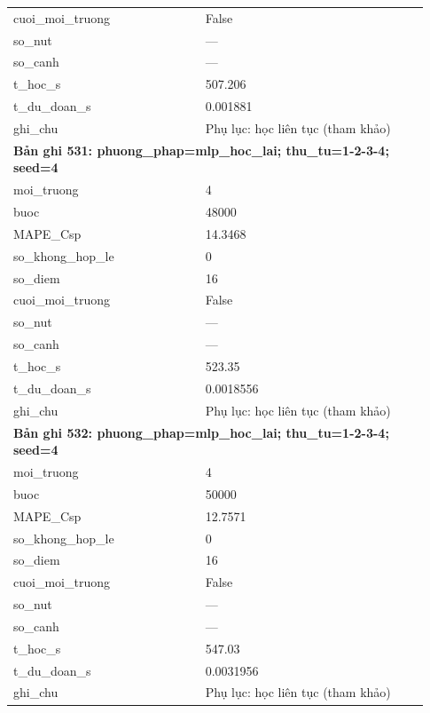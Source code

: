 \begin{longtable}{p{0.43\linewidth}p{0.50\linewidth}}
cuoi\_\allowbreak moi\_\allowbreak truong & False \\
so\_\allowbreak nut & — \\
so\_\allowbreak canh & — \\
t\_\allowbreak hoc\_\allowbreak s & 507.206 \\
t\_\allowbreak du\_\allowbreak doan\_\allowbreak s & 0.001881 \\
ghi\_\allowbreak chu & Phụ lục: học liên tục (tham khảo) \\
\midrule
\multicolumn{2}{p{0.95\linewidth}}{\textbf{Bản ghi 531: phuong\_phap=mlp\_hoc\_lai; thu\_tu=1-2-3-4; seed=4}} \\
moi\_\allowbreak truong & 4 \\
buoc & 48000 \\
MAPE\_\allowbreak Csp & 14.3468 \\
so\_\allowbreak khong\_\allowbreak hop\_\allowbreak le & 0 \\
so\_\allowbreak diem & 16 \\
cuoi\_\allowbreak moi\_\allowbreak truong & False \\
so\_\allowbreak nut & — \\
so\_\allowbreak canh & — \\
t\_\allowbreak hoc\_\allowbreak s & 523.35 \\
t\_\allowbreak du\_\allowbreak doan\_\allowbreak s & 0.0018556 \\
ghi\_\allowbreak chu & Phụ lục: học liên tục (tham khảo) \\
\midrule
\multicolumn{2}{p{0.95\linewidth}}{\textbf{Bản ghi 532: phuong\_phap=mlp\_hoc\_lai; thu\_tu=1-2-3-4; seed=4}} \\
moi\_\allowbreak truong & 4 \\
buoc & 50000 \\
MAPE\_\allowbreak Csp & 12.7571 \\
so\_\allowbreak khong\_\allowbreak hop\_\allowbreak le & 0 \\
so\_\allowbreak diem & 16 \\
cuoi\_\allowbreak moi\_\allowbreak truong & False \\
so\_\allowbreak nut & — \\
so\_\allowbreak canh & — \\
t\_\allowbreak hoc\_\allowbreak s & 547.03 \\
t\_\allowbreak du\_\allowbreak doan\_\allowbreak s & 0.0031956 \\
ghi\_\allowbreak chu & Phụ lục: học liên tục (tham khảo) \\

\end{longtable}
